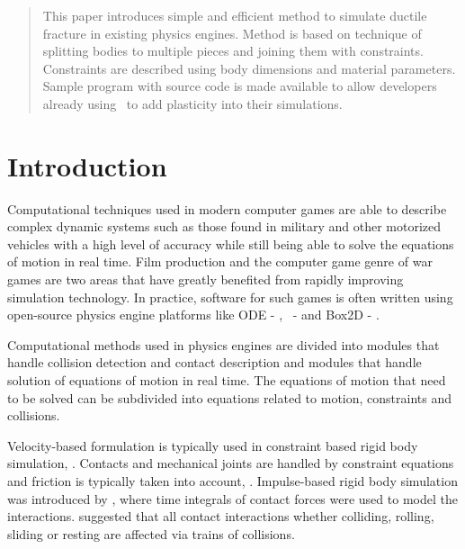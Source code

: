 \begin{abstract}
This paper introduces simple and efficient method to simulate ductile fracture in existing physics engines.
Method is based on technique of splitting bodies to multiple pieces and joining them with constraints.
Constraints are described using body dimensions and material parameters.
Sample program with source code is made available to allow developers already using \cbullet\
to add plasticity into their simulations.
\end{abstract}

\section{Introduction}

Computational techniques used in modern computer games are able to describe
complex dynamic systems such as those found in military and other motorized vehicles
with a high level of accuracy while still being able to solve the equations of motion in real time.
Film production and the computer game genre of war games
are two areas that have greatly benefited from rapidly improving simulation technology. 
In practice, software for such games is often written using open-source physics engine platforms  
like ODE - \cite{ode}, \cbullet\ - \cite{bullet} and Box2D - \cite{box2d}.

Computational methods used in physics engines are divided into modules that handle collision detection and 
contact description and modules that handle solution of equations of motion in real time. 
The equations of motion that need to be 
solved can be subdivided into equations related to motion, constraints and collisions. 

Velocity-based formulation is typically used in constraint based rigid body simulation, \cite{erleben.thesis}. 
Contacts and mechanical joints are handled by constraint equations 
and friction is typically taken into account,
\cite{erleben.thesis}.
Impulse-based rigid body simulation was introduced by \cite{Hahn:1998}, 
where time integrals of contact forces were used to model the interactions.
\cite{mirtich} suggested that all contact interactions
whether colliding, rolling, sliding or resting are affected
via trains of collisions. 

